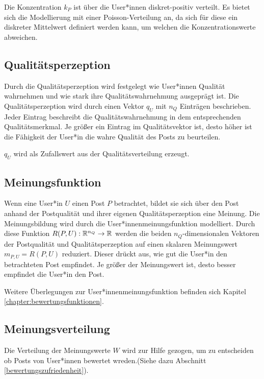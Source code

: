 Die Konzentration $k_P$ ist über die User*innen diskret-positiv verteilt. Es bietet sich die Modellierung mit einer Poisson-Verteilung an, da sich für diese ein diskreter Mittelwert definiert werden kann, um welchen die Konzentrationswerte abweichen.


\subsection{Qualitätsperzeption}
\label{uqualitaet}

Durch die Qualitätsperzeption wird festgelegt wie User*innen Qualität wahrnehmen und wie stark ihre Qualitätswahrnehmung ausgeprägt ist. Die Qualitätsperzeption wird durch einen Vektor $q_U$ mit $n_Q$  Einträgen beschrieben. Jeder Eintrag beschreibt die Qualitätswahrnehmung in dem entsprechenden Qualitätsmerkmal. Je größer ein Eintrag im Qualitätsvektor ist, desto höher ist die Fähigkeit der User*in die wahre Qualität des Posts zu beurteilen.

$q_U$ wird als Zufallswert aus der Qualitätsverteilung erzeugt.

\subsection{Meinungsfunktion}

Wenn eine User*in $U$ einen Post $P$ betrachtet, bildet sie sich über den Post anhand der Postqualität und ihrer eigenen Qualitätsperzeption eine Meinung. Die Meinungsbildung wird durch die User*innenmeinungsfunktion modelliert. Durch diese Funktion $R(P,U): \mathbb{R}^{n_Q} \rightarrow \mathbb{R} $ werden die beiden $n_Q$-dimensionalen Vektoren der Postqualität und Qualitätsperzeption auf einen skalaren Meinungswert $m_{P,U} = R(P,U)$ reduziert. Dieser drückt aus, wie gut die User*in den betrachteten Post empfindet. Je größer der Meinungswert ist, desto besser empfindet die User*in den Post.

Weitere Überlegungen zur User*innenmeinungsfunktion befinden sich Kapitel \ref{chapter:bewertungsfunktionen}.

\subsection{Meinungsverteilung}

Die Verteilung der Meinungswerte $W$ wird zur Hilfe gezogen, um zu entscheiden ob Posts von User*innen bewertet wreden.(Siehe dazu Abschnitt \ref{bewertungszufriedenheit}).

